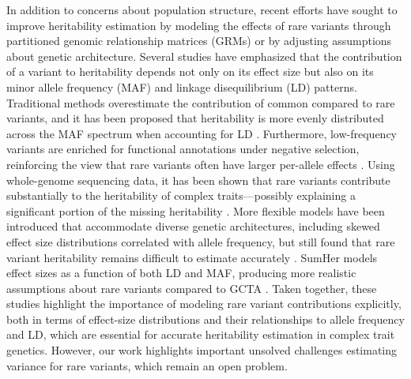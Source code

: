 \documentclass[11pt]{article}
\begin{document}
In addition to concerns about population structure, recent efforts have sought to improve heritability estimation by modeling the effects of rare variants through partitioned genomic relationship matrices (GRMs) or by adjusting assumptions about genetic architecture. Several studies have emphasized that the contribution of a variant to heritability depends not only on its effect size but also on its minor allele frequency (MAF) and linkage disequilibrium (LD) patterns. Traditional methods overestimate the contribution of common compared to rare variants, and it has been proposed that heritability is more evenly distributed across the MAF spectrum when accounting for LD \citep{speed2017reevaluation}. Furthermore, low-frequency variants are enriched for functional annotations under negative selection, reinforcing the view that rare variants often have larger per-allele effects \citep{gazal2018functional}. Using whole-genome sequencing data, it has been shown that rare variants contribute substantially to the heritability of complex traits—possibly explaining a significant portion of the missing heritability \citep{wainschtein2022assessing}. More flexible models have been introduced that accommodate diverse genetic architectures, including skewed effect size distributions correlated with allele frequency, but still found that rare variant heritability remains difficult to estimate accurately \citep{hou2019accurate}. SumHer models effect sizes as a function of both LD and MAF, producing more realistic assumptions about rare variants compared to GCTA \citep{speed2019sumher}. Taken together, these studies highlight the importance of modeling rare variant contributions explicitly, both in terms of effect-size distributions and their relationships to allele frequency and LD, which are essential for accurate heritability estimation in complex trait genetics.
However, our work highlights important unsolved challenges estimating variance for rare variants, which remain an open problem.
\end{document}
